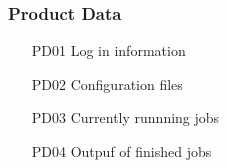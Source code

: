   \subsubsection{Product Data} 
  \begin{itemize}
    \item [PD01] Log in information
    \item [PD02] Configuration files
    \item [PD03] Currently runnning jobs
    \item [PD04] Outpuf of finished jobs
 \end{itemize}

